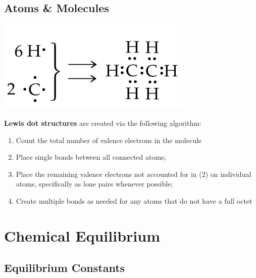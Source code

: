 \documentclass{tufte-book}
\renewcommand{\emph}[1]{\textbf{#1}}
\begin{document}
\section{Atoms \& Molecules}
\begin{marginfigure}[3cm]
\begin{center}
  \includegraphics[width=0.7\textwidth]{lewis} \phantom{mmmm}
\end{center}
\end{marginfigure}
\emph{Lewis dot structures} are created via the following algorithm: \begin{enumerate}
  \item Count the total number of valence electrons in the molecule
  \item Place single bonds between all connected atoms;
  \item Place the remaining valence electrons not accounted for in (2) on individual atoms, specifically as lone pairs whenever possible;
  \item Create multiple bonds as needed for any atoms that do not have a full octet
\end{enumerate}


\chapter{Chemical Equilibrium}

\section{Equilibrium Constants}
\end{document}
